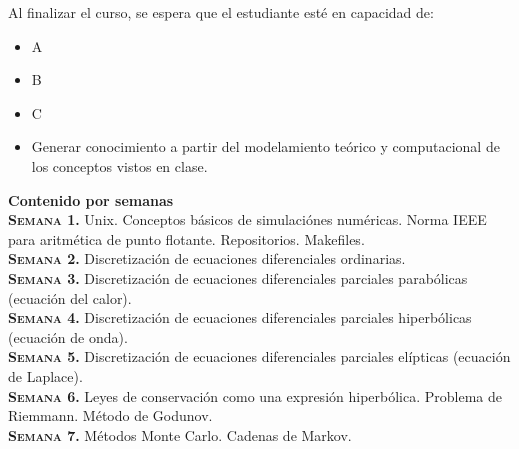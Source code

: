 \documentclass[letterpaper,10pt,onecolumn]{article}
\begin{document}
\noindent\normalsize Al finalizar el curso, se espera que el
estudiante est\'e en capacidad de: 

\begin{itemize}
	\item A \\[-0.6cm]
	\item B\\[-0.6cm] 
	\item C\\[-0.6cm] 
	\item Generar conocimiento a partir del modelamiento te\'orico
          y computacional de los conceptos vistos en clase.\\[-0.2cm] 
\end{itemize}

\noindent\textbf{\large {} \quad Contenido por
  semanas}\\[-0.2cm] 



\noindent\normalsize\textbf{\textsc{Semana 1.}} Unix. Conceptos b\'asicos de
simulaci\'ones num\'ericas. Norma IEEE para aritm\'etica de punto
flotante. Repositorios. Makefiles.
\\[-0.3cm]   

\noindent\textbf{\textsc{Semana 2.}} Discretizaci\'on de ecuaciones
diferenciales ordinarias. 
\\[-0.3cm]  

\noindent\textbf{\textsc{Semana 3.}} 
Discretizaci\'on de ecuaciones
diferenciales parciales parab\'olicas (ecuaci\'on del calor).   
\\[-0.3cm]  

\noindent\textbf{\textsc{Semana 4.}} 
Discretizaci\'on de ecuaciones
diferenciales parciales hiperb\'olicas (ecuaci\'on de onda).   
\\[-0.3cm]  

\noindent\textbf{\textsc{Semana 5.}} 
Discretizaci\'on de ecuaciones
diferenciales parciales el\'ipticas (ecuaci\'on de Laplace).   
\\[-0.3cm]  

\noindent\textbf{\textsc{Semana 6.}}
Leyes de conservaci\'on como una expresi\'on hiperb\'olica. Problema
de Riemmann. M\'etodo de Godunov.
\\[-0.3cm] 

\noindent\textbf{\textsc{Semana 7.}} M\'etodos Monte Carlo. Cadenas de
Markov. \\[-0.3cm]     
\end{document}
